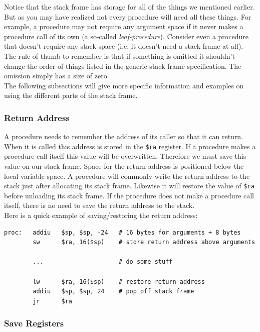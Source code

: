 \documentclass[12pt]{article}
\begin{document}
Notice that the stack frame has storage for all of the things we mentioned
     earlier. But as you may have realized not every procedure will need all
     these things. For example, a procedure may not require any argument space
     if it never makes a procedure call of its own (a so-called
     \textit{leaf-procedure}). Consider even a procedure that doesn't require
     any stack space (i.e. it doesn't need a stack frame at all). The rule of
     thumb to remember is that if something is omitted it shouldn't change the
     order of things listed in the generic stack frame specification. The
     omission simply has a size of zero.\\

The following subsections will give more specific information and examples on
     using the different parts of the stack frame.\\

\subsubsection{Return Address}

A procedure needs to remember the address of its caller so that it can
     return. When it is called this address is stored in the \texttt{\$ra}
     register. If a procedure makes a procedure call itself this value will be
     overwritten. Therefore we must save this value on our stack frame. Space
     for the return address is positioned below the local variable space. A
     procedure will commonly write the return address to the stack just after
     allocating its stack frame. Likewise it will restore the value of
     \texttt{\$ra} before unloading its stack frame. If the procedure does not
     make a procedure call itself, there is no need to save the return address
     to the stack.\\

Here is a quick example of saving/restoring the return address:
\begin{lstlisting}
proc:   addiu   $sp, $sp, -24   # 16 bytes for arguments + 8 bytes
        sw      $ra, 16($sp)    # store return address above arguments

        ...                     # do some stuff

        lw      $ra, 16($sp)    # restore return address
        addiu   $sp, $sp, 24    # pop off stack frame
        jr      $ra
\end{lstlisting}

\newpage
\subsubsection{Save Registers}
\label{sec:saveregs}
\end{document}
